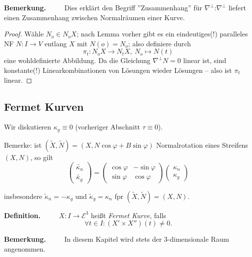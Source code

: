 \documentclass[a4paper,oneside,11pt,DIV=12,parskip=half]{scrartcl}
\newcommand{\E}{\mathcal E}
\newenvironment{definition}{\textbf{Definition.} ~~~~}{}
\newenvironment{note}{\textbf{Bemerkung.} ~~~~}{}
\newenvironment{lemma, definition}{\textbf{Lemma und Definition.} ~~~~}{}
\newenvironment{note, example}{\textbf{Bemerkung und Beispiel.} ~~~~}{}
\newenvironment{note, definition}{\textbf{Bemerkung und Definition.} ~~~~}{}
\begin{document}
\begin{note}
	Dies erklärt den Begriff ''Zusammenhang'' für $\nabla^\perp$:$\nabla^\perp$ liefert einen Zusammenhang zwischen Normalräumen einer Kurve.
\end{note}

\begin{proof}
	Wähle $N_o \in N_oX$; nach Lemma vorher gibt es ein eindeutiges(!) paralleles NF $N : I \rightarrow V$ entlang $X$ mit $N(o) = N_o$; also definiere durch 
	\[\pi_t: N_oX \rightarrow N_t X,~ N_o \mapsto N(t)  \] eine wohldefinierte Abbildung. Da die Gleichung $\nabla^\perp N = 0$ linear ist, sind konstante(!) Linearkombinationen von Lösungen wieder Lösungen -- also ist $\pi_t$ linear.
\end{proof}

\subsection{Fermet Kurven}

Wir diskutieren $\kappa_g \equiv 0$ (vorheriger Abschnitt $\tau \equiv 0$).

Bemerke: ist $(\widetilde{X},\widetilde{N}) =(X,N \cos \varphi + B \sin \varphi )$ Normalrotation eines Streifens $(X,N)$, so gilt 
\begin{equation*}
\begin{pmatrix} 
\widetilde{\kappa_n}\\
\widetilde{\kappa_g}
\end{pmatrix}
=
\begin{pmatrix} 
\cos \varphi & - \sin \varphi \\
\sin \varphi & \cos \varphi
\end{pmatrix}
\begin{pmatrix}
\kappa_n\\
\kappa_g
\end{pmatrix}
\end{equation*}

insbesondere $\widetilde{\kappa}_n = - \kappa_g $ und  $\widetilde{\kappa}_g = \kappa_n$
fpr $(\widetilde{X}, \widetilde{N}) = (X,N)$.

\begin{definition}
	$X: I \rightarrow \E^3$ heißt \textit{Fermet Kurve}, falls \[ \forall t \in I: (X' \times X'')(t) \not = 0. \]
\end{definition}

\begin{note}
	In diesem Kapitel wird stets der 3-dimensionale Raum angenommen.
\end{note}
\end{document}
